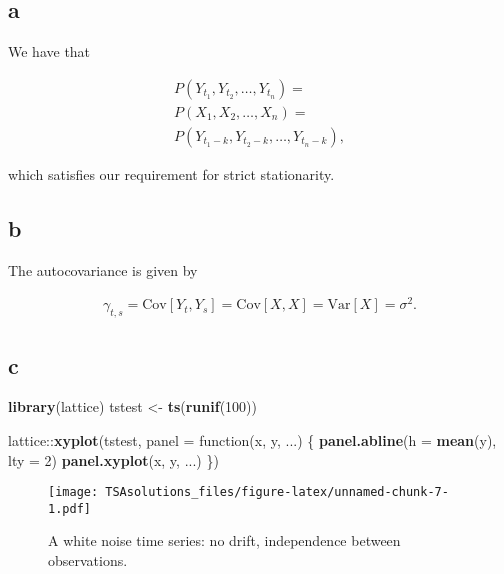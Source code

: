 \documentclass[]{book}
\newenvironment{Shaded}{\begin{snugshade}}{\end{snugshade}}
\newcommand{\KeywordTok}[1]{\textcolor[rgb]{0.13,0.29,0.53}{\textbf{{#1}}}}
\newcommand{\DataTypeTok}[1]{\textcolor[rgb]{0.13,0.29,0.53}{{#1}}}
\newcommand{\DecValTok}[1]{\textcolor[rgb]{0.00,0.00,0.81}{{#1}}}
\newcommand{\StringTok}[1]{\textcolor[rgb]{0.31,0.60,0.02}{{#1}}}
\newcommand{\NormalTok}[1]{{#1}}
\begin{document}
\subsection*{a}\label{a-1}

We have that

\begin{gather*}
P(Y_{t_1}, Y_{t_2}, \dots, Y_{t_n}) = \\
  P(X_1, X_2, \dots, X_n) = \\
  P(Y_{t_1 - k}, Y_{t_2 - k}, \dots, Y_{t_n - k}),
\end{gather*}

which satisfies our requirement for strict stationarity.

\subsection*{b}\label{b-1}

The autocovariance is given by

\begin{gather*}
  \gamma_{t,s}=\text{Cov}[Y_t, Y_s] = \text{Cov}[X,X] = \text{Var}[X] = \sigma^2.
\end{gather*}

\subsection*{c}\label{c-1}

\begin{Shaded}
\begin{Highlighting}[]
\KeywordTok{library}\NormalTok{(lattice)}
\NormalTok{tstest <-}\StringTok{ }\KeywordTok{ts}\NormalTok{(}\KeywordTok{runif}\NormalTok{(}\DecValTok{100}\NormalTok{))}

\NormalTok{lattice::}\KeywordTok{xyplot}\NormalTok{(tstest,}
                \DataTypeTok{panel =} \NormalTok{function(x, y, ...) \{}
                  \KeywordTok{panel.abline}\NormalTok{(}\DataTypeTok{h =} \KeywordTok{mean}\NormalTok{(y), }\DataTypeTok{lty =} \DecValTok{2}\NormalTok{)}
                  \KeywordTok{panel.xyplot}\NormalTok{(x, y, ...)}
                \NormalTok{\})}
\end{Highlighting}
\end{Shaded}

\begin{figure}[htbp]
\centering
\texttt{[image: TSAsolutions\_files/figure-latex/unnamed-chunk-7-1.pdf]}
\caption{\label{fig:unnamed-chunk-7}A white noise time series: no drift,
independence between observations.}
\end{figure}
\end{document}
